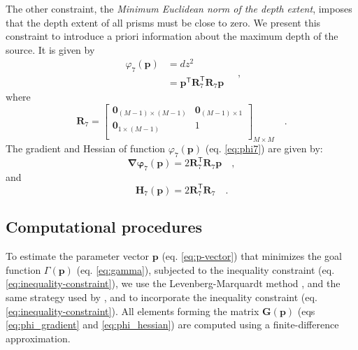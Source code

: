 The other constraint, the \textit{Minimum Euclidean norm of the depth extent}, imposes that the depth extent of all prisms must be close to zero. We present this constraint to introduce a priori information about the maximum depth of the source. It is given by
\begin{equation}\label{eq:phi7}
\begin{split}
\varphi_{7}(\mathbf{p}) &= dz^2 \\
&= \mathbf{p}^{\mathsf{T}} \mathbf{R}_{7}^{\mathsf{T}} \mathbf{R}_{7} \mathbf{p}
\end{split} \quad ,
\end{equation}
where
\begin{equation}
\mathbf{R}_{7} =
\begin{bmatrix}
\mathbf{0}_{(M-1) \times (M-1)} & \mathbf{0}_{(M-1) \times 1} \\
\mathbf{0}_{1 \times (M-1)} & 1 \\
\end{bmatrix}_{ M \times M } \quad .
\end{equation}
The gradient and Hessian of function $\varphi_{7}(\mathbf{p})$ (eq. \ref{eq:phi7}) are given by:
\begin{equation}\label{eq:phi7_grad}
\boldsymbol{\nabla\varphi}_{7}(\mathbf{p}) = 2 \mathbf{R}_{7}^{\mathsf{T}} \mathbf{R}_{7} \mathbf{p} \quad ,
\end{equation}
and
\begin{equation}\label{eq:phi7_hessian}
\mathbf{H}_{7}(\mathbf{p}) = 2 \mathbf{R}^{\mathsf{T}}_{7}\mathbf{R}_{7} \quad .
\end{equation}

\subsection{Computational procedures}

To estimate the parameter vector $\mathbf{p}$ (eq. \ref{eq:p-vector}) that minimizes the goal function $\Gamma(\mathbf{p})$ (eq. \ref{eq:gamma}), subjected to the inequality constraint (eq. \ref{eq:inequality-constraint}), we use the Levenberg-Marquardt method \cite[ p. 240]{aster-etal2019}, and the same strategy used by \cite{barbosa-1999b}, \cite{oliveirajr-etal2011} and \cite{oliveirajr-barbosa2013}  to incorporate the inequality constraint (eq. \ref{eq:inequality-constraint}). All elements forming the matrix $\mathbf{G}(\mathbf{p})$ (eqs \ref{eq:phi_gradient} and \ref{eq:phi_hessian}) are computed using a finite-difference approximation.

